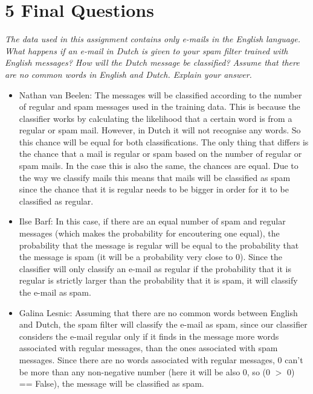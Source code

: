 \documentclass{article}
\begin{document}
\section*{5 Final Questions}
\textit{The  data  used  in  this  assignment  contains  only  e-mails  in  the  English  language.
What happens if an e-mail in Dutch is given to your spam filter trained with English messages?
How  will  the  Dutch  message  be  classified?   Assume  that  there  are  no  common  words  in
English and Dutch.  Explain your answer.}
\begin{itemize}
    \item Nathan van Beelen: The messages will be classified according to the number of
          regular and spam messages used in the training data.
          This is because the classifier works by calculating the likelihood that a
          certain word is from a regular or spam mail. However, in Dutch it will not
          recognise any words. So this chance will be equal for both classifications.
          The only thing that differs is the chance that a mail is regular or spam based
          on the number of regular or spam mails. In the case this is also the same,
          the chances are equal. Due to the way we classify mails this means that
          mails will be classified as spam since the chance that it is regular needs
          to be bigger in order for it to be classified as regular.
    \item Ilse Barf: In this case, if there are an equal number of spam and regular messages
          (which makes the probability for encoutering one equal), the probability that the
          message is regular will be equal to the probability that the message is spam (it will be
          a probability very close to 0).
          Since the classifier will only classify an e-mail as regular if the probability that it
          is regular is strictly larger than the probability that it is spam, it will classify the
          e-mail as spam.
    \item Galina Lesnic: Assuming that there are no common words between English and Dutch, the spam filter will classify the e-mail as spam, since our classifier considers the e-mail regular only if it finds in the message more words associated with regular messages, than the ones associated with spam messages. Since there are no words associated with regular messages, 0 can’t be more than any non-negative number (here it will be also 0, so (0 $>$ 0) == False), the message will be classified as spam.
\end{itemize}
\end{document}
